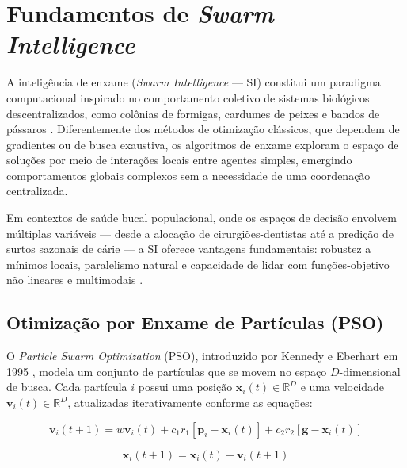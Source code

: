 
\section{Fundamentos de \textit{Swarm Intelligence}}

A inteligência de enxame (\textit{Swarm Intelligence} --- SI) constitui um paradigma computacional inspirado no comportamento coletivo de sistemas biológicos descentralizados, como colônias de formigas, cardumes de peixes e bandos de pássaros \cite{kennedy1995pso, dorigo2006aco}. Diferentemente dos métodos de otimização clássicos, que dependem de gradientes ou de busca exaustiva, os algoritmos de enxame exploram o espaço de soluções por meio de interações locais entre agentes simples, emergindo comportamentos globais complexos sem a necessidade de uma coordenação centralizada.

Em contextos de saúde bucal populacional, onde os espaços de decisão envolvem múltiplas variáveis --- desde a alocação de cirurgiões-dentistas até a predição de surtos sazonais de cárie --- a SI oferece vantagens fundamentais: robustez a mínimos locais, paralelismo natural e capacidade de lidar com funções-objetivo não lineares e multimodais \cite{poli2007pso, zhang2015pso}.

\subsection{Otimização por Enxame de Partículas (PSO)}

O \textit{Particle Swarm Optimization} (PSO), introduzido por Kennedy e Eberhart em 1995 \cite{kennedy1995pso}, modela um conjunto de partículas que se movem no espaço $D$-dimensional de busca. Cada partícula $i$ possui uma posição $\mathbf{x}_i(t) \in \mathbb{R}^D$ e uma velocidade $\mathbf{v}_i(t) \in \mathbb{R}^D$, atualizadas iterativamente conforme as equações:

\begin{equation}
\mathbf{v}_i(t+1) = w \mathbf{v}_i(t) + c_1 r_1 [\mathbf{p}_i - \mathbf{x}_i(t)] + c_2 r_2 [\mathbf{g} - \mathbf{x}_i(t)]
\label{eq:pso_velocity}
\end{equation}

\begin{equation}
\mathbf{x}_i(t+1) = \mathbf{x}_i(t) + \mathbf{v}_i(t+1)
\label{eq:pso_position}
\end{equation}


